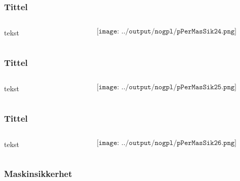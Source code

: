 \documentclass[aspectratio=169,xcolor=dvipsnames]{beamer}
\begin{document}
\begin{frame}
	\frametitle{Tittel}
	\begin{columns}
		\begin{column}{0.5\textwidth}
tekst
			
		\end{column}

		\begin{column}{0.5\textwidth}
	$$\texttt{[image: ../output/nogpl/pPerMasSik24.png]}$$
		\end{column}
	\end{columns}
\end{frame}

\begin{frame}
	\frametitle{Tittel}
	\begin{columns}
		\begin{column}{0.5\textwidth}
tekst
			
		\end{column}

		\begin{column}{0.5\textwidth}
	$$\texttt{[image: ../output/nogpl/pPerMasSik25.png]}$$
		\end{column}
	\end{columns}
\end{frame}

\begin{frame}
	\frametitle{Tittel}
	\begin{columns}
		\begin{column}{0.5\textwidth}
tekst
			
		\end{column}

		\begin{column}{0.5\textwidth}
	$$\texttt{[image: ../output/nogpl/pPerMasSik26.png]}$$
		\end{column}
	\end{columns}
\end{frame}

\begin{frame}
	\frametitle{Maskinsikkerhet}
\end{frame}
\end{document}

